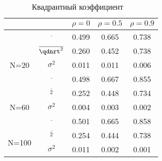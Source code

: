 \documentclass[14pt]{extarticle}
\DeclareMathOperator{\qdrnt}{r_Q} %
\begin{document}
\begin{table}[H]
    \centering
    \begin{tabular}{|c|c|c|c|c|}
        \hline 
        &  & \(\rho=0\) & \(\rho=0.5\) & \(\rho=0.9\) \\
        \hline
        
        & \(\overline{\qdrnt}\) & 0.499 & 0.665 & 0.738 \\ \cline{2-5} 
        \multirow{3}{*}{N=20} & \(\overline{\qdnrt^2}\) & 0.260 & 0.452 & 0.738 \\ \cline{2-5} 
        &  \(\sigma_{\qdrnt}^2\) & 0.011 & 0.011 & 0.006 \\ \cline{1-5} 
        
        & \(\overline{\qdrnt}\) & 0.498 & 0.667 & 0.855 \\ \cline{2-5} 
        \multirow{3}{*}{N=60} & \(\overline{\qdrnt^2}\) & 0.252 & 0.448 & 0.734 \\ \cline{2-5} 
        &  \(\sigma_{\qdrnt}^2\) & 0.004 & 0.003 & 0.002 \\ \cline{1-5} 

        & \(\overline{\qdrnt}\) & 0.501 & 0.665 & 0.858 \\ \cline{2-5} 
        \multirow{3}{*}{N=100} & \(\overline{\qdrnt^2}\) & 0.254 & 0.444 & 0.738 \\ \cline{2-5} 
        &  \(\sigma_{\qdrnt}^2\) & 0.011 & 0.002 & 0.001 \\ \cline{1-5} 
        
        \end{tabular}
    \caption{Квадрантный коэффициент \(\qdrnt\)}
    \label{tab:my-table}
\end{table}
\end{document}
